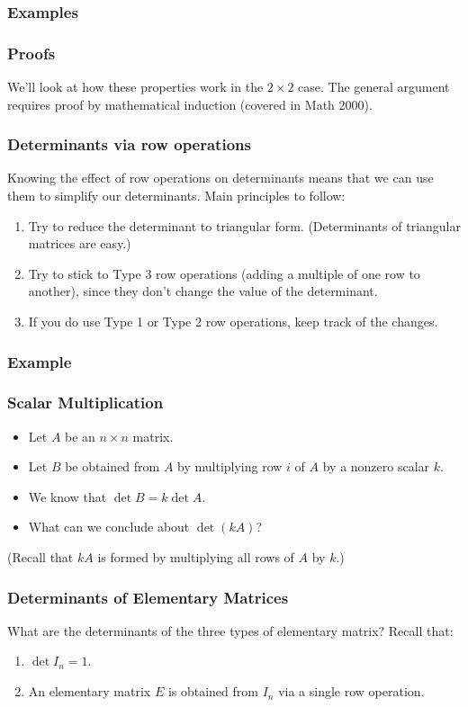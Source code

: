 \documentclass[11pt,t]{beamer}
\begin{document}
\begin{frame}\frametitle{Examples}
 
\end{frame}
\begin{frame}\frametitle{Proofs}
 We'll look at how these properties work in the $2\times 2$ case. The general argument requires \alert{proof by mathematical induction} (covered in Math 2000).

\end{frame}
\begin{frame}\frametitle{Determinants via row operations}
 Knowing the effect of row operations on determinants means that we can use them to simplify our determinants. Main principles to follow:
\begin{enumerate}
 \item Try to reduce the determinant to triangular form. (Determinants of triangular matrices are easy.)
 \item Try to stick to Type 3 row operations (adding a multiple of one row to another), since \alert{they don't change the value of the determinant}.
 \item If you do use Type 1 or Type 2 row operations, \alert{keep track of the changes}.
\end{enumerate}

\end{frame}
\begin{frame}\frametitle{Example}
 
\end{frame}
\begin{frame}
\frametitle{Scalar Multiplication}
\begin{itemize}
\item Let $A$ be an $n\times n$ matrix.
\item Let $B$ be obtained from $A$ by multiplying row $i$ of $A$ by a nonzero scalar $k$.
\item We know that $\det B = k\det A$.
\item What can we conclude about $\det (kA)$? 
\end{itemize}
(Recall that $kA$ is formed by multiplying \alert{all} rows of $A$ by $k$.)
\end{frame}
\begin{frame}
\frametitle{Determinants of Elementary Matrices}
What are the determinants of the three types of elementary matrix? Recall that:
\begin{enumerate}
\item $\det I_n = 1$.
\item An elementary matrix $E$ is obtained from $I_n$ via a \alert{single} row operation.
\end{enumerate}
\end{frame}
\end{document}
